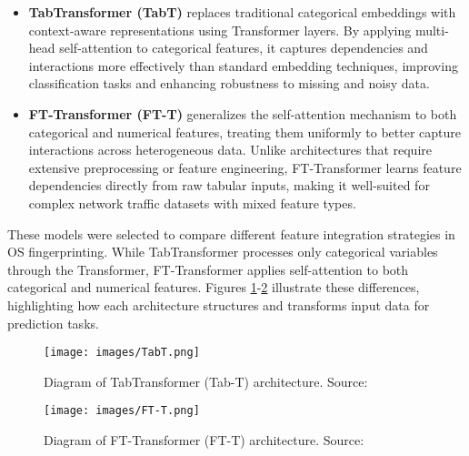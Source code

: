 \begin{itemize}
    \item \textbf{TabTransformer (TabT)} \cite{huang_tabtransformer_2020} replaces traditional categorical embeddings with context-aware representations using Transformer layers. By applying multi-head self-attention to categorical features, it captures dependencies and interactions more effectively than standard embedding techniques, improving classification tasks and enhancing robustness to missing and noisy data.

    \item \textbf{FT-Transformer (FT-T)} \cite{gorishniy_revisiting_2023} generalizes the self-attention mechanism to both categorical and numerical features, treating them uniformly to better capture interactions across heterogeneous data. Unlike architectures that require extensive preprocessing or feature engineering, FT-Transformer learns feature dependencies directly from raw tabular inputs, making it well-suited for complex network traffic datasets with mixed feature types.
\end{itemize}

These models were selected to compare different feature integration strategies in OS fingerprinting. While TabTransformer processes only categorical variables through the Transformer, FT-Transformer applies self-attention to both categorical and numerical features. Figures \ref{fig:tabt}-\ref{fig:ftt} illustrate these differences, highlighting how each architecture structures and transforms input data for prediction tasks.

\begin{figure}[b!]
    \centering
    \texttt{[image: images/TabT.png]}    
    \caption{Diagram of TabTransformer (Tab-T) architecture. Source: \cite{wang_lucidrainstab-transformer-pytorch_2024}}
    \label{fig:tabt}
\end{figure}

\begin{figure}[b!]
    \centering
    \texttt{[image: images/FT-T.png]}    
    \caption{Diagram of FT-Transformer (FT-T) architecture. Source: \cite{wang_lucidrainstab-transformer-pytorch_2024}}
    \label{fig:ftt}
\end{figure}

\clearpage
